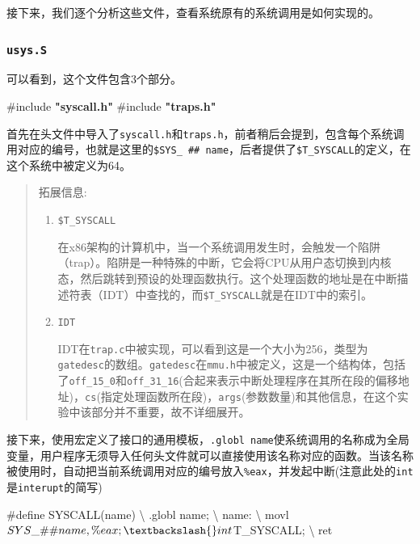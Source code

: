 \documentclass[
]{article}
\newenvironment{Shaded}{}{}
\newcommand{\ImportTok}[1]{\textcolor[rgb]{0.00,0.50,0.00}{\textbf{#1}}}
\newcommand{\NormalTok}[1]{#1}
\newcommand{\PreprocessorTok}[1]{\textcolor[rgb]{0.74,0.48,0.00}{#1}}
\begin{document}
接下来，我们逐个分析这些文件，查看系统原有的系统调用是如何实现的。

\subsubsection{\texorpdfstring{\texttt{usys.S}}{usys.S}}\label{usyss}

可以看到，这个文件包含3个部分。

\begin{Shaded}
	\begin{Highlighting}[]
		\PreprocessorTok{\#include }\ImportTok{"syscall.h"}
		\PreprocessorTok{\#include }\ImportTok{"traps.h"}
	\end{Highlighting}
\end{Shaded}

首先在头文件中导入了\texttt{syscall.h}和\texttt{traps.h}，前者稍后会提到，包含每个系统调用对应的编号，也就是这里的\texttt{\$SYS\_\ \#\#\ name}，后者提供了\texttt{\$T\_SYSCALL}的定义，在这个系统中被定义为64。

\begin{quote}
	拓展信息:

	\begin{enumerate}
		\def\labelenumi{\arabic{enumi}.}
		\item
		      \texttt{\$T\_SYSCALL}

		      在x86架构的计算机中，当一个系统调用发生时，会触发一个陷阱（trap）。陷阱是一种特殊的中断，它会将CPU从用户态切换到内核态，然后跳转到预设的处理函数执行。这个处理函数的地址是在中断描述符表（IDT）中查找的，而\texttt{\$T\_SYSCALL}就是在IDT中的索引。
		\item
		      \texttt{IDT}

		      IDT在\texttt{trap.c}中被实现，可以看到这是一个大小为256，类型为\texttt{gatedesc}的数组。\texttt{gatedesc}在\texttt{mmu.h}中被定义，这是一个结构体，包括了\texttt{off\_15\_0}和\texttt{off\_31\_16}(合起来表示中断处理程序在其所在段的偏移地址)，\texttt{cs}(指定处理函数所在段)，\texttt{args}(参数数量)和其他信息，在这个实验中该部分并不重要，故不详细展开。
	\end{enumerate}
\end{quote}

接下来，使用宏定义了接口的通用模板，\texttt{.globl\ name}使系统调用的名称成为全局变量，用户程序无须导入任何头文件就可以直接使用该名称对应的函数。当该名称被使用时，自动把当前系统调用对应的编号放入\texttt{\%eax}，并发起中断(注意此处的\texttt{int}是\texttt{interupt}的简写)

\begin{Shaded}
	\begin{Highlighting}[]
		\NormalTok{\#define SYSCALL(name) \textbackslash{}}
		\NormalTok{  .globl name; \textbackslash{}}
		\NormalTok{  name: \textbackslash{}}
		\NormalTok{    movl $SYS\_ \#\# name, \%eax; \textbackslash{}}
		\NormalTok{    int $T\_SYSCALL; \textbackslash{}}
		\NormalTok{    ret}
	\end{Highlighting}
\end{Shaded}
\end{document}
